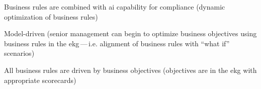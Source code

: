 \kgmmscoringlevelFour

\begin{scoring}

    \item Business rules are combined with \gls{ai} capability for compliance (dynamic optimization of
          business rules)
    \item Model-driven (senior management can begin to optimize business objectives using business rules in
          the \gls{ekg}\,---\,i.e. alignment of business rules with “what if” scenarios)

\end{scoring}

\kgmmscoringlevelFive

\begin{scoring}

    \item All business rules are driven by business objectives (objectives are in the \gls{ekg} with appropriate scorecards)

\end{scoring}

